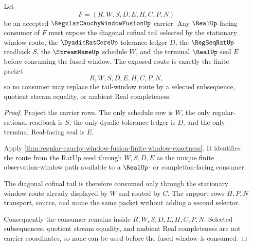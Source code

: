 \begin{theorem}
\label{thm:regular-cauchy-window-fusion-tail-window-coverage}
Let
$$
F=(R,W,S,D,E,H,C,P,N)
$$
be an accepted $\RegularCauchyWindowFusionUp$ carrier. Any $\RealUp$-facing consumer of $F$ must expose the diagonal cofinal tail selected by the stationary window route, the $\DyadicRatCoreUp$ tolerance ledger $D$, the $\RegSeqRatUp$ readback $S$, the $\StreamNameUp$ schedule $W$, and the terminal $\RealUp$ seal $E$ before consuming the fused window. The exposed route is exactly the finite packet
$$
R,W,S,D,E,H,C,P,N,
$$
so no consumer may replace the tail-window route by a selected subsequence, quotient stream equality, or ambient Real completeness.
\end{theorem}
\begin{proof}
Project the carrier rows. The only schedule row is $W$, the only regular-rational readback is $S$, the only dyadic tolerance ledger is $D$, and the only terminal Real-facing seal is $E$.

Apply \autoref{thm:regular-cauchy-window-fusion-finite-window-exactness}. It identifies the route from the RatUp seed through $W,S,D,E$ as the unique finite observation-window path available to a $\RealUp$- or completion-facing consumer.

The diagonal cofinal tail is therefore consumed only through the stationary window route already displayed by $W$ and routed by $C$. The support rows $H,P,N$ transport, source, and name the same packet without adding a second selector.

Consequently the consumer remains inside $R,W,S,D,E,H,C,P,N$. Selected subsequences, quotient stream equality, and ambient Real completeness are not carrier coordinates, so none can be used before the fused window is consumed.
\end{proof}

